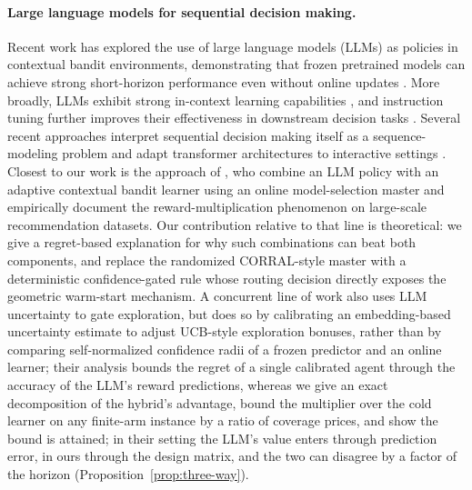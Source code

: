 \documentclass{article}
\theoremstyle{definition}
\theoremstyle{remark}
\theoremstyle{remark}
\begin{document}
\paragraph{Large language models for sequential decision making.}
Recent work has explored the use of large language models (LLMs) as policies
in contextual bandit environments, demonstrating that frozen pretrained
models can achieve strong short-horizon performance even without online
updates \cite{chen2024llmdecision}. More broadly, LLMs exhibit strong
in-context learning capabilities \cite{brown2020language,xie2021explanation,
garg2022can,akyurek2022learning}, and instruction tuning further improves
their effectiveness in downstream decision tasks
\cite{ouyang2022training,chung2024scaling}. Several recent approaches
interpret sequential decision making itself as a sequence-modeling problem
and adapt transformer architectures to interactive settings
\cite{chen2021decision,zheng2022online,reid2022can,sun2023smart,
raparthy2023generalization,lee2023supervised}.
Closest to our work is the approach of \cite{chen2024llmdecision}, who
combine an LLM policy with an adaptive contextual bandit learner using an
online model-selection master and empirically document the
reward-multiplication phenomenon on large-scale recommendation datasets.
Our contribution relative to that line is theoretical: we give a
regret-based explanation for why such combinations can beat both components,
and replace the randomized CORRAL-style master with a deterministic
confidence-gated rule whose routing decision directly exposes the geometric
warm-start mechanism. A concurrent line of work \cite{huangcontextual} also
uses LLM uncertainty to gate exploration, but does so by calibrating an
embedding-based uncertainty estimate to adjust UCB-style exploration
bonuses, rather than by comparing self-normalized confidence radii of a
frozen predictor and an online learner; their analysis bounds the regret
of a single calibrated agent through the accuracy of the LLM's reward
predictions, whereas we give an exact decomposition of the hybrid's
advantage, bound the multiplier over the cold learner on any finite-arm
instance by a ratio of coverage prices, and show the bound is attained; in
their setting the LLM's value enters through prediction error, in ours
through the design matrix, and the two can disagree by a factor of the
horizon (Proposition~\ref{prop:three-way}).
\end{document}
